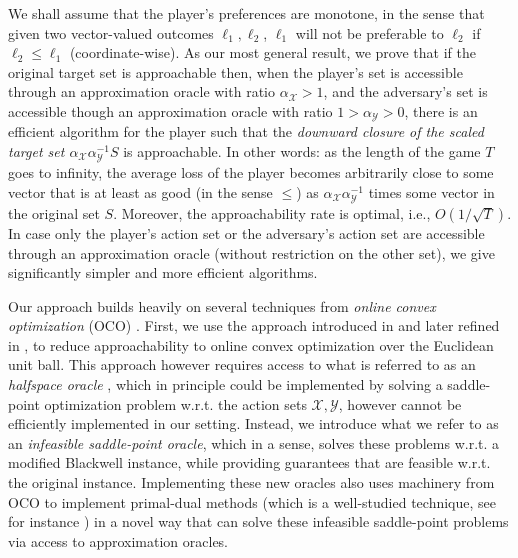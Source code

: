 \documentclass[a4paper,12pt]{article}
\newcommand{\mY}{\mathcal{Y}}
\newcommand{\mX}{\mathcal{X}}
\begin{document}
We shall assume that the player's preferences are monotone, in the sense that given two vector-valued outcomes $\ell_1,\ell_2$, $\ell_1$ will not be preferable to $\ell_2$ if $\ell_2 \leq \ell_1$ (coordinate-wise). As our most general result, we prove that if the original target set is approachable then,  when the player's set is accessible through an approximation oracle with ratio $\alpha_{\mX} > 1$, and the adversary's set is accessible though an approximation oracle with ratio $1 > \alpha_{\mY} > 0$, there is an efficient algorithm for the player such that the \textit{downward closure of the scaled target set $\alpha_{\mX}\alpha_{\mY}^{-1}S$} is approachable.  In other words: as the length of the game $T$ goes to infinity, the average loss of the player becomes arbitrarily close to some vector that is at least as good (in the sense $\leq$) as $\alpha_{\mX}\alpha_{\mY}^{-1}$ times some vector in the original set  $S$. Moreover, the approachability rate is optimal, i.e., $O(1/\sqrt{T})$. In case only the player's action set or the adversary's action set are accessible through an approximation oracle (without restriction on the other set), we give significantly simpler and more efficient algorithms.

Our approach builds heavily on several techniques from  \textit{online convex optimization} (OCO) \cite{DBLP:journals/corr/abs-1909-05207}. First, we use the approach introduced in \cite{abernethy2011blackwell} and later refined in \cite{shimkin2016online}, to reduce approachability to online convex optimization over the Euclidean unit ball. This approach however requires access to what is referred to as an \textit{halfspace oracle} \cite{abernethy2011blackwell}, which in principle could be implemented by solving a saddle-point optimization problem w.r.t. the action sets $\mX,\mY$, however cannot be efficiently implemented in our setting. Instead, we introduce what we refer to as an \textit{infeasible saddle-point oracle}, which in a sense, solves these problems w.r.t. a modified Blackwell instance, while providing guarantees that are feasible w.r.t. the original instance. Implementing these new oracles also uses machinery from  OCO to implement primal-dual methods (which is a well-studied technique, see for instance \cite{hazan2006approximate})  in a novel way that can solve these infeasible saddle-point problems via access to approximation oracles.
\end{document}
